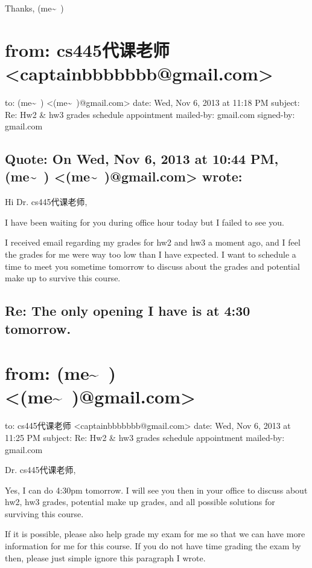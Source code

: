 \documentclass[12pt]{book}
\begin{document}
Thanks,
(me\textasciitilde{}~)

\section{from:         cs445代课老师 <captainbbbbbbb@gmail.com>}
\label{sec-35-4}
to:         (me\textasciitilde{}~) <(me\textasciitilde{}~)@gmail.com>
date:         Wed, Nov 6, 2013 at 11:18 PM
subject:         Re: Hw2 \& hw3 grades  schedule appointment
mailed-by:         gmail.com
signed-by:         gmail.com

\subsection{Quote: On Wed, Nov 6, 2013 at 10:44 PM, (me\textasciitilde{}~) <(me\textasciitilde{}~)@gmail.com> wrote:}
\label{sec-35-4-1}
Hi Dr. cs445代课老师, 

I have been waiting for you during office hour today but I failed to see you. 

I received email regarding my grades for hw2 and hw3 a moment ago, and I feel the grades for me were way too low than I have expected. I want to schedule a time to meet you sometime tomorrow to discuss about the grades and potential make up to survive this course. 

\subsection{Re: The only opening I have is at 4:30 tomorrow.}
\label{sec-35-4-2}

\section{from:         (me\textasciitilde{}~) <(me\textasciitilde{}~)@gmail.com>}
\label{sec-35-5}
to:         cs445代课老师 <captainbbbbbbb@gmail.com>
date:         Wed, Nov 6, 2013 at 11:25 PM
subject:         Re: Hw2 \& hw3 grades  schedule appointment
mailed-by:         gmail.com

Dr. cs445代课老师, 

Yes, I can do 4:30pm tomorrow. I will see you then in your office to discuss about hw2, hw3 grades, potential make up grades, and all possible solutions for surviving this course. 

If it is possible, please also help grade my exam for me so that we can have more information for me for this course. If you do not have time grading the exam by then, please just simple ignore this paragraph I wrote. 
\end{document}
